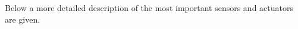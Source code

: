 Below a more detailed description of the most important sensors and actuators are given. 


\begin{figure}
\centering
{}\\
\end{figure}
